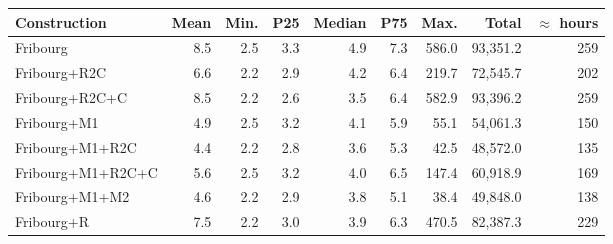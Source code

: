 \begin{tabular}{LrrrrrrRr}
  \hline
Construction & Mean & Min. & P25 & Median & P75 & Max. & Total & $\approx$ hours \\ 
  \hline
Fribourg & 8.5 & 2.5 & 3.3 & 4.9 & 7.3 & 586.0 & 93,351.2 & 259 \\ 
  Fribourg+R2C & 6.6 & 2.2 & 2.9 & 4.2 & 6.4 & 219.7 & 72,545.7 & 202 \\ 
  Fribourg+R2C+C & 8.5 & 2.2 & 2.6 & 3.5 & 6.4 & 582.9 & 93,396.2 & 259 \\ 
  Fribourg+M1 & 4.9 & 2.5 & 3.2 & 4.1 & 5.9 & 55.1 & 54,061.3 & 150 \\ 
  Fribourg+M1+R2C & 4.4 & 2.2 & 2.8 & 3.6 & 5.3 & 42.5 & 48,572.0 & 135 \\ 
  Fribourg+M1+R2C+C & 5.6 & 2.5 & 3.2 & 4.0 & 6.5 & 147.4 & 60,918.9 & 169 \\ 
  Fribourg+M1+M2 & 4.6 & 2.2 & 2.9 & 3.8 & 5.1 & 38.4 & 49,848.0 & 138 \\ 
  Fribourg+R & 7.5 & 2.2 & 3.0 & 3.9 & 6.3 & 470.5 & 82,387.3 & 229 \\ 
   \hline
\end{tabular}
